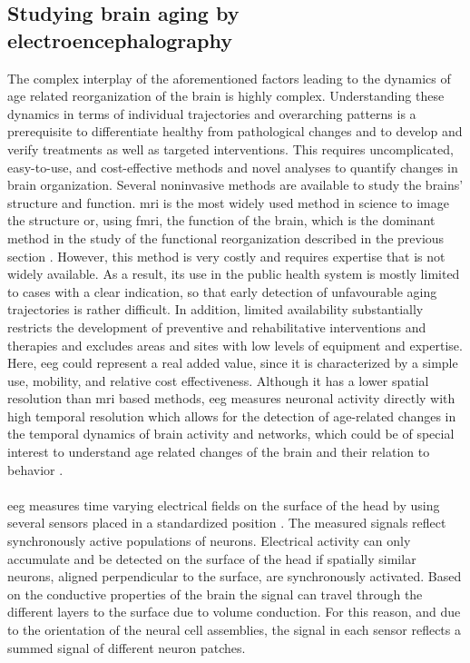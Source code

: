 \subsection{Studying brain aging by electroencephalography}
The complex interplay of the aforementioned factors leading to the dynamics of age related reorganization of the brain is highly complex. Understanding these dynamics in terms of individual trajectories and overarching patterns is a prerequisite to differentiate healthy from pathological changes and to develop and verify treatments as well as targeted interventions. This requires uncomplicated, easy-to-use, and cost-effective methods and novel analyses to quantify changes in brain organization. Several noninvasive methods are available to study the brains' structure and function. \Gls{mri} is the most widely used method in science to image the structure or, using \gls{fmri}, the function of the brain, which is the dominant method in the study of the functional reorganization described in the previous section \cite{Reuter-Lorenz2010}. However, this method is very costly and requires expertise that is not widely available. As a result, its use in the public health system is mostly limited to cases with a clear indication, so that early detection of unfavourable aging trajectories is rather difficult. In addition, limited availability substantially restricts the development of preventive and rehabilitative interventions and therapies and excludes areas and sites with low levels of equipment and expertise. Here, \gls{eeg} could represent a real added value, since it is characterized by a simple use, mobility, and relative cost effectiveness.  Although it has a lower spatial resolution than \gls{mri} based methods, \gls{eeg} measures neuronal activity directly with high temporal resolution which allows for the detection of age-related changes in the temporal dynamics of brain activity and networks, which could be of special interest to understand age related changes of the brain and their relation to behavior \cite{Courtney2021}.\\
\\
\Gls{eeg} measures time varying electrical fields on the surface of the head by using several sensors placed in a standardized position \cite{Jackson2014}. The measured signals reflect synchronously active populations of neurons. Electrical activity can only accumulate and be detected on the surface of the head if spatially similar neurons, aligned perpendicular to the surface, are synchronously activated. Based on the conductive properties of the brain the signal can travel through the different layers to the surface due to volume conduction. For this reason, and due to the orientation of the neural cell assemblies, the signal in each sensor reflects a summed signal of different neuron patches.\\
